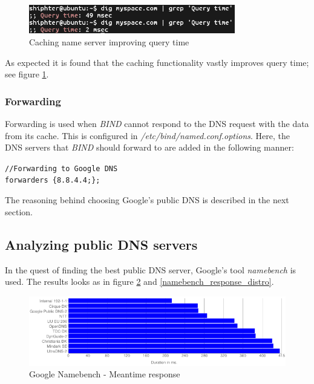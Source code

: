 \begin{figure}[ht!]
\centering
\includegraphics[width=90mm]{img/dig_caching_querytime.png}
\caption{Caching name server improving query time}
\label{dig_caching_querytime}
\end{figure}

As expected it is found that the caching functionality vastly improves query time; see figure \ref{dig_caching_querytime}.

\subsubsection{Forwarding}
Forwarding is used when \emph{BIND} cannot respond to the DNS request with the data from its cache. This is configured in \emph{/etc/bind/named.conf.options}. Here, the DNS servers that \emph{BIND} should forward to are added in the following manner:

\texttt{//Forwarding to Google DNS} \\
\texttt{forwarders \{8.8.4.4;\};}

The reasoning behind choosing Google's public DNS is described in the next section.

\subsection{Analyzing public DNS servers}
In the quest of finding the best public DNS server, Google's tool \emph{namebench} is used. The results looks as in figure \ref{namebench_meantime_response_chart} and \ref{namebench_response_distro}.

\begin{figure}[H]
\centering
\includegraphics[width=150mm]{img/namebench_meantime_response_chart.png}
\caption{Google Namebench - Meantime response}
\label{namebench_meantime_response_chart}
\end{figure}

